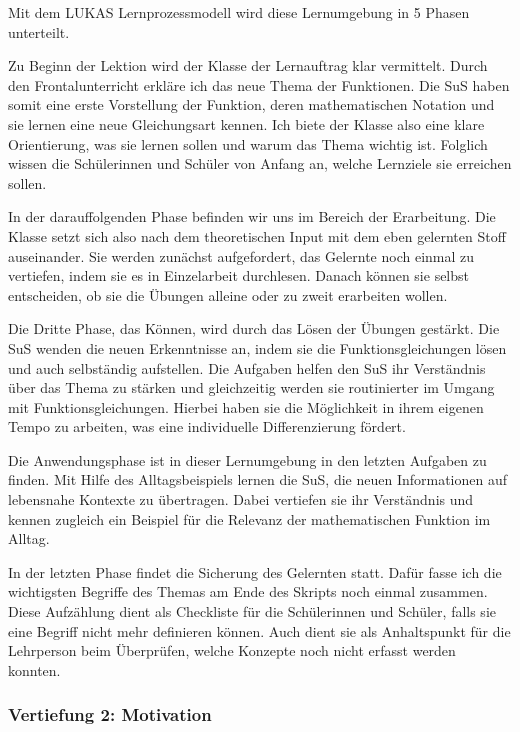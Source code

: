 \documentclass[
  10pt,
  a4paper,
  DIV=11]{scrartcl}
\theoremstyle{definition}
\theoremstyle{remark}
\begin{document}
\begin{tcolorbox}
Mit dem LUKAS Lernprozessmodell wird diese Lernumgebung in 5 Phasen
unterteilt.

Zu Beginn der Lektion wird der Klasse der Lernauftrag klar vermittelt.
Durch den Frontalunterricht erkläre ich das neue Thema der Funktionen.
Die SuS haben somit eine erste Vorstellung der Funktion, deren
mathematischen Notation und sie lernen eine neue Gleichungsart kennen.
Ich biete der Klasse also eine klare Orientierung, was sie lernen sollen
und warum das Thema wichtig ist. Folglich wissen die Schülerinnen und
Schüler von Anfang an, welche Lernziele sie erreichen sollen.

In der darauffolgenden Phase befinden wir uns im Bereich der
Erarbeitung. Die Klasse setzt sich also nach dem theoretischen Input mit
dem eben gelernten Stoff auseinander. Sie werden zunächst aufgefordert,
das Gelernte noch einmal zu vertiefen, indem sie es in Einzelarbeit
durchlesen. Danach können sie selbst entscheiden, ob sie die Übungen
alleine oder zu zweit erarbeiten wollen.

Die Dritte Phase, das Können, wird durch das Lösen der Übungen gestärkt.
Die SuS wenden die neuen Erkenntnisse an, indem sie die
Funktionsgleichungen lösen und auch selbständig aufstellen. Die Aufgaben
helfen den SuS ihr Verständnis über das Thema zu stärken und
gleichzeitig werden sie routinierter im Umgang mit Funktionsgleichungen.
Hierbei haben sie die Möglichkeit in ihrem eigenen Tempo zu arbeiten,
was eine individuelle Differenzierung fördert.

Die Anwendungsphase ist in dieser Lernumgebung in den letzten Aufgaben
zu finden. Mit Hilfe des Alltagsbeispiels lernen die SuS, die neuen
Informationen auf lebensnahe Kontexte zu übertragen. Dabei vertiefen sie
ihr Verständnis und kennen zugleich ein Beispiel für die Relevanz der
mathematischen Funktion im Alltag.

In der letzten Phase findet die Sicherung des Gelernten statt. Dafür
fasse ich die wichtigsten Begriffe des Themas am Ende des Skripts noch
einmal zusammen. Diese Aufzählung dient als Checkliste für die
Schülerinnen und Schüler, falls sie eine Begriff nicht mehr definieren
können. Auch dient sie als Anhaltspunkt für die Lehrperson beim
Überprüfen, welche Konzepte noch nicht erfasst werden konnten.

\subsubsection{Vertiefung 2: Motivation}\label{vertiefung-2-motivation}


\end{tcolorbox}
\end{document}
